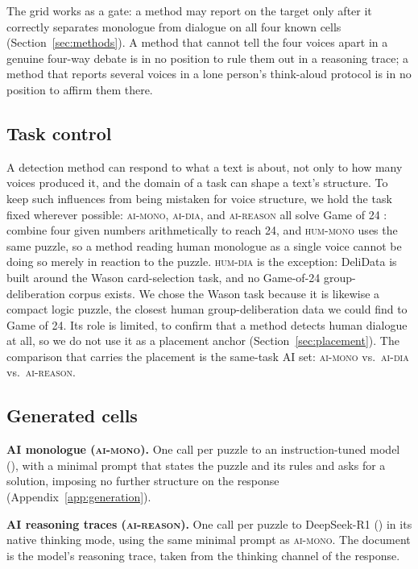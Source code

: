 \documentclass[11pt]{article}
\newcommand{\cellhm}{\textsc{hum-mono}}
\newcommand{\cellhd}{\textsc{hum-dia}}
\newcommand{\cellad}{\textsc{ai-dia}}
\newcommand{\cellam}{\textsc{ai-mono}}
\newcommand{\cellrt}{\textsc{ai-reason}}
\begin{document}
The grid works as a gate: a method may report on the target only after it
correctly separates monologue from dialogue on all four known cells
(Section~\ref{sec:methods}). A method that cannot tell the four voices apart
in a genuine four-way debate is in no position to rule them out in a reasoning
trace; a method that reports several voices in a lone person's think-aloud
protocol is in no position to affirm them there.

\subsection{Task control}
\label{sec:task}

A detection method can respond to what a text is about, not only to how many
voices produced it, and the domain of a task can shape a text's structure. To
keep such influences from being mistaken for voice structure, we hold the task
fixed wherever possible: \cellam{}, \cellad{}, and \cellrt{} all solve Game of
24 \citep{yao2023tree}: combine four given numbers arithmetically to reach
24, and \cellhm{} uses the same puzzle, so a method reading human monologue as
a single voice cannot be doing so merely in reaction to the puzzle. \cellhd{}
is the exception: DeliData is built around the Wason card-selection task, and
no Game-of-24 group-deliberation corpus exists. We chose the Wason task because
it is likewise a compact logic puzzle, the closest human group-deliberation
data we could find to Game of 24. Its role is limited, to confirm that a
method detects human dialogue at all, so we do not use it as a placement
anchor (Section~\ref{sec:placement}). The comparison that carries the placement
is the same-task AI set: \cellam{} vs.\ \cellad{} vs.\ \cellrt{}.

\subsection{Generated cells}
\label{sec:generation}

\textbf{AI monologue (\cellam{}).} One call per puzzle to an
instruction-tuned model (), with a minimal
prompt that states the puzzle and its rules and asks for a solution, imposing
no further structure on the response (Appendix~\ref{app:generation}).

\textbf{AI reasoning traces (\cellrt{}).} One call per puzzle to DeepSeek-R1
() in its native thinking mode, using the same
minimal prompt as \cellam{}. The document is the model's reasoning trace,
taken from the thinking channel of the response.
\end{document}
